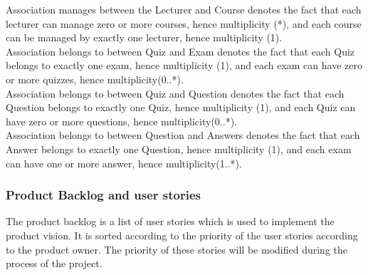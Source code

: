 \documentclass{scrartcl}
\begin{document}
Association manages between the Lecturer and Course denotes the fact that each lecturer can manage zero or more courses, hence multiplicity (*), and each course can be managed by exactly one lecturer, hence multiplicity (1). \\
Association belongs to between Quiz and Exam denotes the fact that each Quiz belongs to exactly one exam, hence multiplicity (1), and each exam can have zero or more quizzes, hence multiplicity(0..*). \\
Association belongs to between Quiz and Question denotes the fact that each Question belongs to exactly one Quiz, hence multiplicity (1), and each Quiz can have zero or more questions, hence multiplicity(0..*). \\
Association belongs to between Question and Answers denotes the fact that each Answer belongs to exactly one Question, hence multiplicity (1), and each exam can have one or more answer, hence multiplicity(1..*). \\
\subsubsection{Product Backlog and user stories}
The product backlog is a list of user stories which is used to implement the product vision. It is sorted according to the priority of the user stories according to the product owner. The priority of these stories will be modified during the process of the project.\\


 
\end{document}
